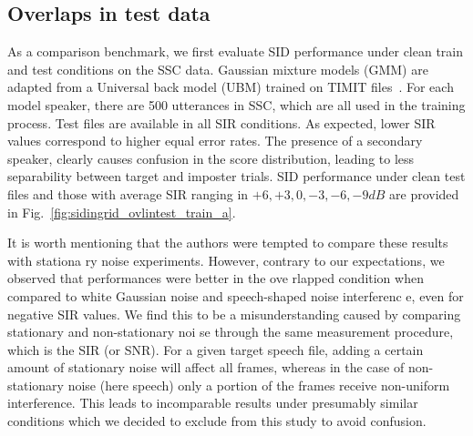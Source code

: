 \subsection{Overlaps in test data}
As a comparison benchmark, we first evaluate SID performance under clean train and test conditions on the SSC data.
Gaussian mixture models (GMM) are adapted from a Universal back model (UBM) trained on TIMIT files~\cite{msridentity}.
For each model speaker, there are 500 utterances in SSC, which are all used in the training process. Test files are available in all SIR conditions.
As expected, lower SIR values correspond to higher equal error rates.
The presence of a secondary speaker, clearly causes confusion in the score distribution, leading to less separability between target and imposter trials.
SID performance under clean test files and those with average SIR ranging in $+6, +3, 0, -3
, -6, -9 dB$ are provided in Fig.~\ref{fig:sidingrid_ovlintest_train_a}.

It is worth mentioning that the authors were tempted to compare these results with stationa
ry noise experiments.
However, contrary to our expectations, we observed that performances were better in the ove
rlapped condition when compared to white Gaussian noise and speech-shaped noise interferenc
e, even for negative SIR values.
We find this to be a misunderstanding caused by comparing stationary and non-stationary noi
se through the same measurement procedure, which is the SIR (or SNR).
For a given target speech file, adding a certain amount of stationary noise will affect all frames, whereas in the case of non-stationary noise (here speech) only a portion of the frames receive non-uniform interference.
This leads to incomparable results under presumably similar conditions which we decided to exclude from this study to avoid confusion.

